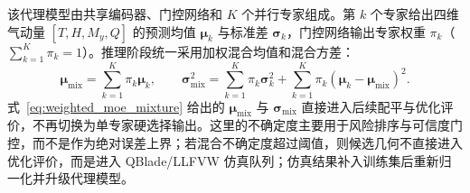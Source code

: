 该代理模型由共享编码器、门控网络和 $K$ 个并行专家组成。第 $k$ 个专家给出四维气动量 $[T,H,M_y,Q]$ 的预测均值 $\bm{\mu}_k$ 与标准差 $\bm{\sigma}_k$，门控网络输出专家权重 $\pi_k$（$\sum_{k=1}^{K}\pi_k=1$）。推理阶段统一采用加权混合均值和混合方差：
\begin{equation}
\bm{\mu}_{\mathrm{mix}} = \sum_{k=1}^{K}\pi_k\bm{\mu}_k,\qquad
\bm{\sigma}_{\mathrm{mix}}^2 =
\sum_{k=1}^{K}\pi_k\bm{\sigma}_k^2
+
\sum_{k=1}^{K}\pi_k(\bm{\mu}_k-\bm{\mu}_{\mathrm{mix}})^2 .
\label{eq:weighted_moe_mixture}
\end{equation}
式~\ref{eq:weighted_moe_mixture} 给出的 $\bm{\mu}_{\mathrm{mix}}$ 与 $\bm{\sigma}_{\mathrm{mix}}$ 直接进入后续配平与优化评价，不再切换为单专家硬选择输出。这里的不确定度主要用于风险排序与可信度门控，而不是作为绝对误差上界；若混合不确定度超过阈值，则候选几何不直接进入优化评价，而是进入 QBlade/LLFVW 仿真队列；仿真结果补入训练集后重新归一化并升级代理模型。

